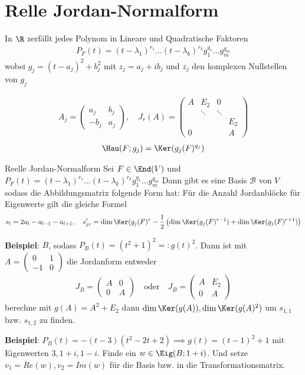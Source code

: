 \section{Relle Jordan-Normalform}
In $\R$ zerfällt jedes Polynom in Lineare und Quadratische Faktoren
\begin{align*}
    P_F(t) = (t-\lambda_1)^{r_1} \dots (t - \lambda_k)^{r_k} g_1^{q_1} \dots g_m^{q_m}
\end{align*}
wobei $g_j = (t - a_j)^2 + b_j^2$ mit $z_j = a_j + i b_j$ und $\overline{z_j}$ den komplexen Nullstellen von $g_j$

\begin{align*}
    A_j = \begin{pmatrix}
        a_j & b_j\\
        -b_j & a_j
    \end{pmatrix}, \quad J_r(A) = \begin{pmatrix}
        A & E_2 & 0\\
        & \ddots & \ddots & \\
        & & & E_2\\
        0 & & & A
    \end{pmatrix}
\end{align*}
\begin{align*}
    \Hau(F;g_j) = \Ker(g_j(F)^{q_j})
\end{align*}

\begin{satz}{Reelle Jordan-Normalform}
    Sei $F \in \End(V)$ und $P_F(t) = (t-\lambda_1)^{r_1} \dots (t - \lambda_k)^{r_k} g_1^{q_1} \dots g_m^{q_m}$
    Dann gibt es eine Basis $\mathcal{B}$ von $V$ sodass
    die Abbildungsmatrix folgende Form hat:
    Für die Anzahl Jordanblöcke für Eigenwerte gilt die gleiche Formel
    \begin{align*}
        s_{l} = 2a_l - a_{l-1} - a_{l+1}, \quad 
        s_{jr}' = \dim \Ker(g_j(F)^{r} - \frac{1}{2} \left(
            \dim \Ker (g_j(F)^{r-1}) + \dim \Ker (g_j(F)^{r+1})
        \right)
    \end{align*}
\end{satz}

\textbf{Beispiel}: \quad $B$, sodass $P_B(t) = (t^2 + 1)^2 =: g(t)^2$. Dann ist mit $A = \begin{pmatrix}
    0 & 1\\
    -1 & 0
\end{pmatrix}$ die Jordanform entweder
\begin{align*}
    J_B = \begin{pmatrix}
        A & 0\\
        0 & A
    \end{pmatrix} \quad \text{oder} \quad J_B = \begin{pmatrix}
        A & E_2\\
        0 & A
    \end{pmatrix}
\end{align*}
berechne mit $g(A) = A^2 + E_2$ dann $\dim \Ker (g(A)), \dim \Ker(g(A)^2)$ um $s_{1,1}$ bzw. $s_{1,2}$ zu finden.

\textbf{Beispiel}: \quad $P_B(t) = -(t-3)(t^2 - 2t + 2) \implies g(t) = (t-1)^2 + 1$ mit Eigenwerten $3, 1+i, 1-i$. Finde ein $w \in \Eig(B;1+i)$. Und setze $v_1 = Re(w), v_2 = Im(w)$ für die Basis bzw. in die Transformationsmatrix.



